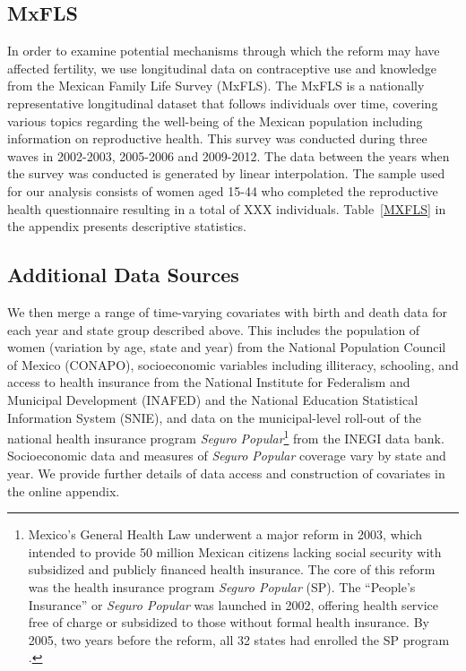 \documentclass[a4paper,11pt]{article}
\begin{document}
\begin{spacing}{1.5}
\subsection{MxFLS}
 In order to examine potential mechanisms through which the reform may have affected fertility, we use longitudinal data on contraceptive use and knowledge from the Mexican Family Life Survey (MxFLS). The MxFLS is a nationally representative longitudinal dataset that follows individuals over time, covering various topics regarding the well-being of the Mexican population including information on reproductive health. This survey was conducted during three waves in 2002-2003, 2005-2006 and 2009-2012. The data between the years when the survey was conducted is generated by linear interpolation. The sample used for our analysis consists of women aged 15-44 who completed the reproductive health questionnaire resulting in a total of XXX individuals. Table~\ref{MXFLS} in the appendix presents descriptive statistics.  
\subsection{Additional Data Sources}
We then merge a range of time-varying covariates with birth and death data for each year and state group described above.  This includes the population of women (variation by age, state and year) from the National Population Council of Mexico (CONAPO), socioeconomic variables including illiteracy, schooling, and access to health insurance from the National Institute for Federalism and Municipal Development (INAFED) and the National Education Statistical Information System (SNIE), and data on the municipal-level roll-out of the national health insurance program \emph{Seguro Popular}\footnote{Mexico's General Health Law underwent a major reform in 2003, which intended to provide 50 million Mexican citizens lacking social security with subsidized and publicly financed health insurance. The core of this reform was the health insurance program \emph{Seguro Popular} (SP). The ``People's Insurance'' or \emph{Seguro Popular} was launched in 2002, offering health service free of charge or subsidized to those without formal health insurance. By 2005, two years before the reform, all 32 states had enrolled the SP program \citep{Knauletal2007}.} from the INEGI data bank.  Socioeconomic data and measures of \emph{Seguro Popular} coverage vary by state and year.  We provide further details of data access and construction of covariates in the online appendix.

\end{spacing}
\end{document}
